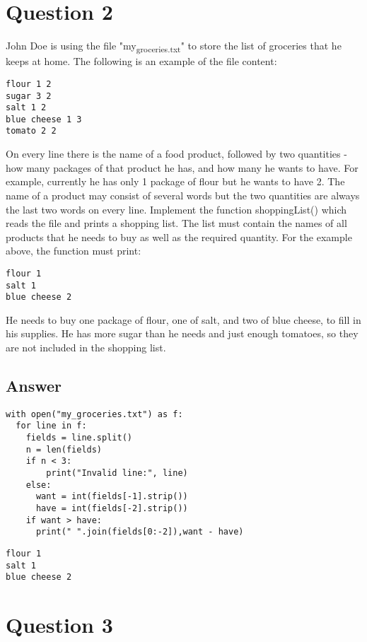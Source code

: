 \documentclass[11pt]{article}
\begin{document}
\section{Question 2}
\label{sec:org0db8fa3}


John Doe is using the file "my\textsubscript{groceries.txt}" to store the list of groceries that he keeps at home.
The following is an example of the file content:
\begin{verbatim}
flour 1 2
sugar 3 2
salt 1 2
blue cheese 1 3
tomato 2 2
\end{verbatim}
On every line there is the name of a food product, followed by two quantities - how many
packages of that product he has, and how many he wants to have. For example, currently he has
only 1 package of flour but he wants to have 2. The name of a product may consist of several
words but the two quantities are always the last two words on every line.
Implement the function shoppingList() which reads the file and prints a shopping list. The list must
contain the names of all products that he needs to buy as well as the required quantity. For the
example above, the function must print:
\begin{verbatim}
flour 1
salt 1
blue cheese 2
\end{verbatim}
He needs to buy one package of flour, one of salt, and two of blue cheese, to fill in his supplies.
He has more sugar than he needs and just enough tomatoes, so they are not included in the
shopping list.

\subsection{Answer}
\label{sec:org07f3346}

\begin{verbatim}
with open("my_groceries.txt") as f:
  for line in f:
    fields = line.split()
    n = len(fields)
    if n < 3:
        print("Invalid line:", line)
    else:
      want = int(fields[-1].strip())
      have = int(fields[-2].strip())
    if want > have:
      print(" ".join(fields[0:-2]),want - have)
\end{verbatim}

\begin{verbatim}
flour 1
salt 1
blue cheese 2
\end{verbatim}

\section{Question 3}
\label{sec:org3e63f11}
\end{document}
